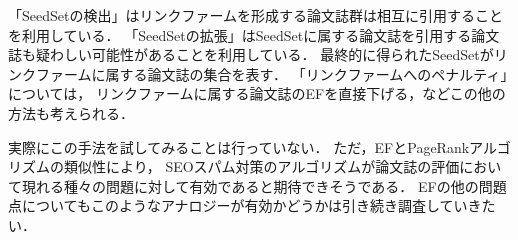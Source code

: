 「SeedSetの検出」はリンクファームを形成する論文誌群は相互に引用することを利用している．
「SeedSetの拡張」はSeedSetに属する論文誌を引用する論文誌も疑わしい可能性があることを利用している．
最終的に得られたSeedSetがリンクファームに属する論文誌の集合を表す．
「リンクファームへのペナルティ」については，
リンクファームに属する論文誌のEFを直接下げる，などこの他の方法も考えられる．
\par
実際にこの手法を試してみることは行っていない．
ただ，EFとPageRankアルゴリズムの類似性により，
SEOスパム対策のアルゴリズムが論文誌の評価において現れる種々の問題に対して有効であると期待できそうである．
EFの他の問題点についてもこのようなアナロジーが有効かどうかは引き続き調査していきたい．~\cite{NASA}